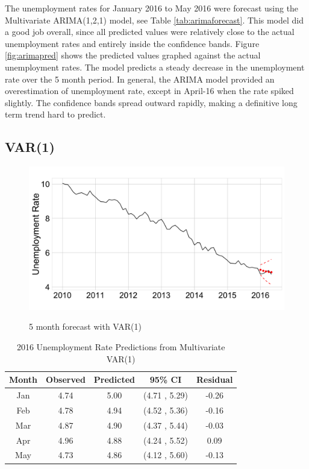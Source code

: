 \documentclass[twoside,twocolumn]{article}
\begin{document}
The unemployment rates for January 2016 to May 2016 were forecast using the Multivariate ARIMA(1,2,1) model, see Table \ref{tab:arimaforecast}.  This model did a good job overall, since all predicted values were relatively close to the actual unemployment rates and entirely inside the confidence bands.  Figure \ref{fig:arimapred} shows the predicted values graphed against the actual unemployment rates. The model predicts a steady decrease in the unemployment rate over the 5 month period.  In general, the ARIMA model provided an overestimation of unemployment rate, except in April-16 when the rate spiked slightly. The confidence bands spread outward rapidly, making a definitive long term trend hard to predict.

\subsection{VAR(1)}

   \begin{figure}[htb]
    	\centering
     	\caption{5 month forecast with VAR(1)}
     	\includegraphics[width=\linewidth]{images/varpred}
     	\label{fig:varpred}
 \end{figure}

\begin{table}[ht]
\centering
\small
\caption{2016 Unemployment Rate Predictions from Multivariate VAR(1)}
\label{tab:varforecast}
\begin{tabular}{ccccc}
  \hline
Month & Observed & Predicted& 95\% CI  & Residual \\
  \hline
Jan  & 4.74 & 5.00 & (4.71 , 5.29) & -0.26 \\
Feb & 4.78 & 4.94 & (4.52 , 5.36) & -0.16 \\
Mar  & 4.87 & 4.90 & (4.37 , 5.44) & -0.03 \\
Apr & 4.96 & 4.88 & (4.24 , 5.52) & 0.09 \\
May & 4.73 & 4.86 & (4.12 , 5.60) & -0.13 \\
   \hline
\end{tabular}
\end{table}
\end{document}
